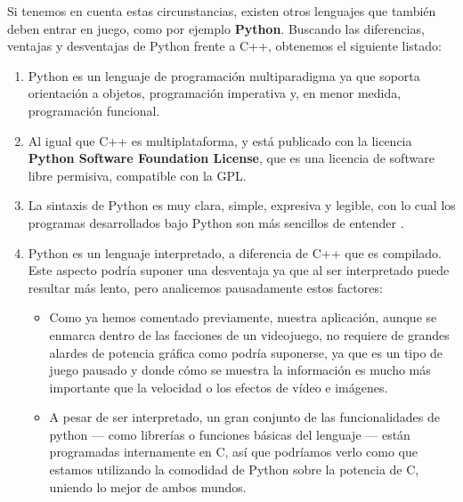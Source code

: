 Si tenemos en cuenta estas circunstancias, existen otros lenguajes que también deben entrar en juego,
como por ejemplo \textbf{Python}. Buscando las diferencias, ventajas y desventajas de Python frente a C++,
obtenemos el siguiente listado:

\begin{enumerate}
    \item Python es un lenguaje de programación multiparadigma ya que soporta orientación a objetos,
            programación imperativa y, en menor medida, programación funcional.
    \item Al igual que C++ es multiplataforma, y está publicado con la licencia \textbf{Python Software Foundation
            License}, que es una licencia de software libre permisiva, compatible con la GPL.
    \item La sintaxis de Python es muy clara, simple, expresiva y legible, con lo cual los programas
            desarrollados bajo Python son más sencillos de entender \cite{Pilgrim:2004:DP:983200}.
    \item Python es un lenguaje interpretado, a diferencia de C++ que es compilado. Este aspecto podría suponer una
            desventaja ya que al ser interpretado puede resultar más lento, pero analicemos pausadamente estos
            factores:
        \begin{itemize}
            \item Como ya hemos comentado previamente, nuestra aplicación, aunque se enmarca dentro de las
                    facciones de un videojuego, no requiere de grandes alardes de potencia gráfica como podría
                    suponerse, ya que es un tipo de juego pausado y donde cómo se muestra la información
                    es mucho más importante que la velocidad o los efectos de vídeo e imágenes.
            \item A pesar de ser interpretado, un gran conjunto de las funcionalidades de python --- como librerías o
                    funciones básicas del lenguaje --- están programadas internamente en C, así que podríamos
                    verlo como que estamos utilizando la comodidad de Python sobre la potencia de C, uniendo
                    lo mejor de ambos mundos.
        \end{itemize}
\end{enumerate}

